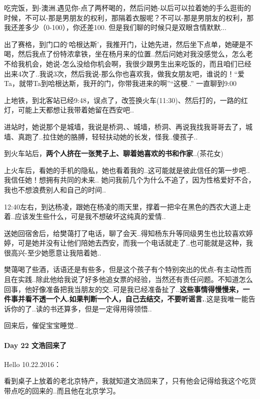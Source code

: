 \documentclass[UTF8,a4paper,8pt]{ctexbook}
\begin{document}
	 	 吃完饭，到-澳洲.遇见你-点了两杯喝的，然后问她-以后可以拉着她的手么逛街的时候，不可以-那是男朋友的权利，那隔着衣服呢？不可以-那是男朋友的权利，那我还差多少（0-100），你还差100. 但是我们聊的时候只是双眼含情默默...
	 	 
	 	 出了赛格，到门口的‘哈根达斯’，我推开门，让她先进，然后坐下点单，她硬是不喝，然后我点了份特浓拿铁，坐在杨月来的位置..然后问她对我没感觉么，怎么老不给我机会，她说-怎么没给你机会啊，我很少跟男生出来吃饭的，而且咱们已经出来4次了..我说3次，然后我说-那么你也喜欢我，做我女朋友吧，谁说的！“爱Ta，就带Ta到哈根达斯，我开的门，你带我进来的啊”“这梗..”  一直聊到9:00
	 	 
	 	 上地铁，到北客站已经9:48，误点了，改签换火车(11:30)、然后打的，一路的红灯，可能上天都想让我带着她留在西安吧..
	 	 
	 	 进站时，她说那个是城墙，我说是桥洞、、城墙，桥洞、再说我找我哥哥去了，城墙、真跑了..拉住她的胳膊，轻轻扶动她的长发，怪我..傻孩子..
	 	 
	 	 到火车站后，\textbf{两个人挤在一张凳子上、聊着她喜欢的书和作家}..(茶花女)
	 	 
	 	 上火车后，看她的手机的隐私，她也看着我的..这可能就是彼此信任的第一步吧..我信任她！想拥有共同的未来..
	 	 她问我前几个为什么不追了，因为性格爱好不合，我也不想浪费别人和自己的时间..
	 	 
	 	 12:40左右，到达杨凌，跟她在杨凌的雨天里，撑着一把伞在黑色的西农大道上走着..应该发生些什么，可是我不想破坏这纯真的爱情..
	 	 
	 	 送她回宿舍后，给樊蔼打了电话，聊了会天..得知杨东升等同级男生也比较喜欢婷婷，可是她并没有让他们陪她去西安，而我一个电话就走了..也可能就是这种，我很高兴-至少她愿意让我陪着她..
	 	 
	 	 樊蔼喝了些酒，话语还是有些多，但是这个孩子有个特别突出的优点-有主动性而且在实践..除此他给我说了好多他追女票的经验，当然还有责任问题。不知道怎么回事，他好像准备把我当朋友的交..可是我已经准备扯了..\textbf{这些事情得慢慢来，一件事并看不透一个人.如果判断一个人，自己去结交，不要听谣言.}.这是我唯一能告诉你的了..读的书还算多，但是一定得用得领悟..
	 	 
	 	 回来后，催促宝宝睡觉..
	 	 
 	 \paragraph{Day 22   文浩回来了   \quad     }
	 	 Hello 10.22.2016：
	 	 
	 	 看到桌子上放着的老北京特产，我就知道文浩回来了，只有他会记得给我这个吃货带点吃的回来的..而且他在北京学习。
	 	 
\end{document}
